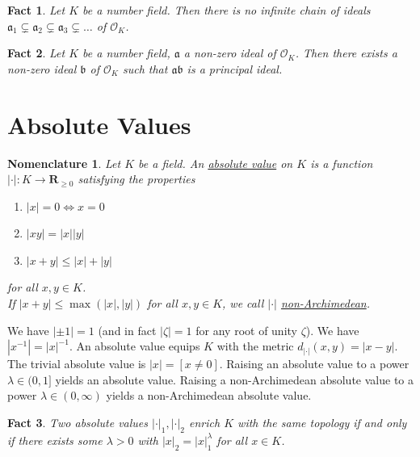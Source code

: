 \documentclass[12pt]{article}
\newtheorem*{fact*}{Fact}
\newtheorem*{nomn*}{Nomenclature}
\renewcommand{\a}{\mathfrak{a}}
\newcommand{\abs}[1]{\left\lvert#1\right\rvert}
\renewcommand{\b}{\mathfrak{b}}
\newcommand{\too}{\longrightarrow}
\newcommand{\R}{\mathbf{R}}
\newcommand{\OO}{\mathcal{O}}
\begin{document}
\begin{fact*}
Let $K$ be a number field. Then there is no infinite chain of ideals $\a_1 \subsetneq \a_2 \subsetneq \a_3 \subsetneq \dots$ of $\OO_K$.
\end{fact*}

\begin{fact*}
Let $K$ be a number field, $\a$ a non-zero ideal of $\OO_K$. Then there exists a non-zero ideal $\b$ of $\OO_K$ such that $\a\b$ is a principal ideal.
\end{fact*}

\newpage
\section{Absolute Values}


\begin{nomn*}
Let $K$ be a field. An \underline{absolute value} on $K$ is a function $\abs{\cdot} : K\too \R_{\ge0}$ satisfying the properties
\begin{enumerate}
    \item $\abs{x} = 0 \iff x = 0$
    \item $\abs{xy} = \abs{x}\abs{y}$
    \item $\abs{x+y} \le \abs{x} + \abs{y}$
\end{enumerate}
for all $x,y\in K$. \\
If $\abs{x+y} \le \max(\abs{x},\abs{y})$ for all $x,y\in K$, we call $\abs{\cdot}$ \underline{non-Archimedean}. 
\end{nomn*}


We have $\abs{\pm 1} = 1$ (and in fact $\abs{\zeta}=1$ for any root of unity $\zeta$). We have $\abs{x^{-1}} = \abs{x}^{-1}$. An absolute value equips $K$ with the metric $d_{\abs{\cdot}}(x,y) = \abs{x-y}$. The trivial absolute value is $\abs{x} = [x \neq 0]$. Raising an absolute value to a power $\lambda \in (0,1]$ yields an absolute value. Raising a non-Archimedean absolute value to a power $\lambda\in(0,\infty)$ yields a non-Archimedean absolute value.


\begin{fact*}
Two absolute values $\abs{\cdot}_1, \abs{\cdot}_2$ enrich $K$ with the same topology if and only if there exists some $\lambda > 0$ with $\abs{x}_2 = \abs{x}_1^\lambda$ for all $x\in K$.
\end{fact*}
\end{document}
